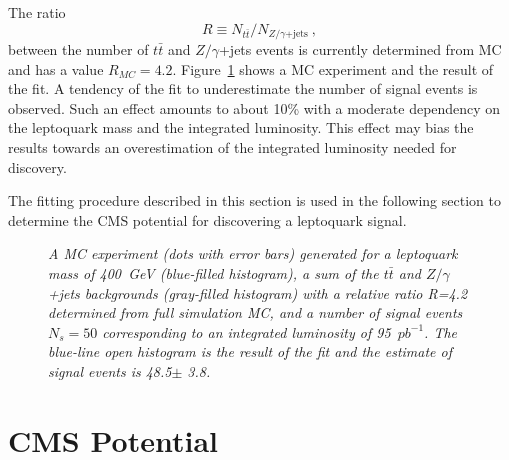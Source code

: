 \documentclass[colclass=cmspaper]{combine}
\begin{document}
\begin{linenumbers}
The ratio
\begin{displaymath}
  R \equiv N_{t\bar{t}} / N_{Z/\gamma\mathrm{+jets}}~\mathrm{,}
\end{displaymath}
between the number of $t\bar{t}$ and $Z/\gamma$+jets events is currently determined from 
MC and has a value $R_{MC}=4.2$.
Figure~\ref{fig:Mej_fit} shows a MC experiment and the result of the fit.
A tendency of the fit to underestimate the number of signal events is observed. 
Such an effect amounts to about 10\% with a moderate dependency on the leptoquark mass and the 
integrated luminosity. This effect may bias the results towards an overestimation of the integrated
luminosity needed for discovery.

The fitting procedure described in this section is used in the following section
to determine the CMS potential for discovering a leptoquark signal. 

 \begin{figure}[htb]
   \begin{center}
     \caption{\small \sl A MC experiment (dots with error bars) generated for a leptoquark mass of 
       400~GeV (blue-filled histogram), a sum of the $t\bar{t}$ and $Z/\gamma$+jets 
       backgrounds (gray-filled histogram) with a relative ratio R=4.2 determined from 
       full simulation MC, and a number of signal events $N_s=50$ corresponding
       to an integrated luminosity of 95~$pb^{-1}$.
       The blue-line open histogram is the result of the fit and the estimate of signal 
       events is 48.5$\pm$ 3.8.}
     \label{fig:Mej_fit}
   \end{center}
 \end{figure}






\section{CMS Potential} \label{CMSpotential}






\end{linenumbers}
\end{document}
